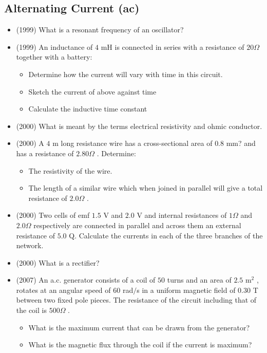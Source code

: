 \documentclass{article}
\begin{document}
\subsection{Alternating Current (ac)}
\begin{itemize}
\item (1999)  What is a resonant frequency of an oscillator?
\item (1999)  An inductance of $ 4$ mH is connected in series with a resistance of $ 20\Omega $ together with a battery:
 \begin{itemize}
\item Determine how the current will vary with time in this circuit.
\item Sketch the current of above against time
\item Calculate the inductive time constant
\end{itemize}
\item (2000)  What is meant by the terms electrical resistivity and ohmic conductor.
\item (2000)  A $ 4$ m long resistance wire has a cross-sectional area of $ 0.8$ mm? and has a resistance of $ 2.80\Omega $ .  Determine:
 \begin{itemize}
\item The resistivity of the wire.
\item The length of a similar wire which when joined in parallel will give a total resistance of $ 2.0\Omega $ .
\end{itemize}
\item (2000)  Two cells of emf $ 1.5$ V and $ 2.0$ V and internal resistances of $ 1\Omega $ and $ 2.0\Omega $ respectively are connected in parallel and across them an external resistance of $ 5.0$ Q. Calculate the currents in each of the three branches of the network. 
\item (2000)  What is a rectifier?
\item (2007)  An a.c. generator consists of a coil of $ 50$ turns and an area of $ 2.5$ m$ ^{2}$ , rotates at an angular speed of $ 60$ rad$/$s in a uniform magnetic field of $ 0.30$ T between two fixed pole pieces.  The resistance of the circuit including that of the coil is $ 500\Omega $ .  
 \begin{itemize}
\item  What is the maximum current that can be drawn from the generator?
\item  What is the magnetic flux through the coil if the current is maximum?
\end{itemize}

\end{itemize}
\end{document}
